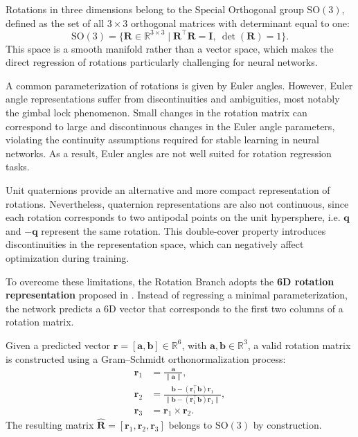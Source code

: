 Rotations in three dimensions belong to the Special Orthogonal group $\mathrm{SO}(3)$, defined as the set of all $3 \times 3$ orthogonal matrices with determinant equal to one:
\begin{equation}
    \mathrm{SO}(3) = \{ \mathbf{R} \in \mathbb{R}^{3 \times 3} \mid \mathbf{R}^\top \mathbf{R} = \mathbf{I}, \ \det(\mathbf{R}) = 1 \}.
\end{equation}
This space is a smooth manifold rather than a vector space, which makes the direct regression of rotations particularly challenging for neural networks.

A common parameterization of rotations is given by Euler angles.
However, Euler angle representations suffer from discontinuities and ambiguities, most notably the gimbal lock phenomenon.
Small changes in the rotation matrix can correspond to large and discontinuous changes in the Euler angle parameters, violating the continuity assumptions required for stable learning in neural networks.
As a result, Euler angles are not well suited for rotation regression tasks.

Unit quaternions provide an alternative and more compact representation of rotations.
Nevertheless, quaternion representations are also not continuous, since each rotation corresponds to two antipodal points on the unit hypersphere, i.e. $\mathbf{q}$ and $-\mathbf{q}$ represent the same rotation.
This double-cover property introduces discontinuities in the representation space, which can negatively affect optimization during training.

To overcome these limitations, the Rotation Branch adopts the \textbf{6D rotation representation} proposed in \cite{zhou2019continuity}.
Instead of regressing a minimal parameterization, the network predicts a 6D vector that corresponds to the first two columns of a rotation matrix.

Given a predicted vector $\mathbf{r} = [\mathbf{a}, \mathbf{b}] \in \mathbb{R}^6$, with $\mathbf{a}, \mathbf{b} \in \mathbb{R}^3$, a valid rotation matrix is constructed using a Gram--Schmidt orthonormalization process:
\begin{align}
    \mathbf{r}_1 &= \frac{\mathbf{a}}{\|\mathbf{a}\|}, \\
    \mathbf{r}_2 &= \frac{\mathbf{b} - (\mathbf{r}_1^\top \mathbf{b}) \mathbf{r}_1}{\|\mathbf{b} - (\mathbf{r}_1^\top \mathbf{b}) \mathbf{r}_1\|}, \\
    \mathbf{r}_3 &= \mathbf{r}_1 \times \mathbf{r}_2.
\end{align}
The resulting matrix $\mathbf{\hat{R}} = [\mathbf{r}_1, \mathbf{r}_2, \mathbf{r}_3]$ belongs to $\mathrm{SO}(3)$ by construction.

